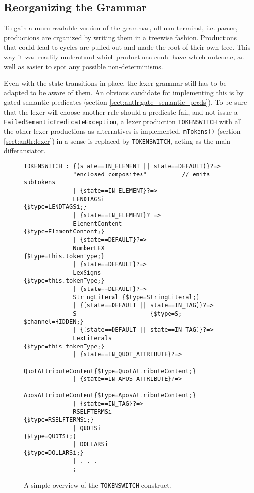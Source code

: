 \subsection{Reorganizing the Grammar}
\label{sect:rewriteGrammar:reorganizing}

To gain a more readable version of the grammar, all non-terminal, i.e. parser, productions are organized by writing them in a treewise fashion. Productions that could lead to cycles are pulled out and made the root of their own tree. This way it was readily understood which productions could have which outcome, as well as easier to spot any possible non-determinisms.

Even with the state transitions in place, the lexer grammar still has to be adapted to be aware of them. An obvious candidate for implementing this is by gated semantic predicates (section \ref{sect:antlr:gate_semantic_preds}). To be sure that the lexer will choose another rule should a predicate fail, and not issue a \verb!FailedSemanticPredicateException!, a lexer production \verb!TOKENSWITCH! with all the other lexer productions as alternatives is implemented. \verb!mTokens()! (section \ref{sect:antlr:lexer}) in a sense is replaced by \verb!TOKENSWITCH!, acting as the main differansiator. 

\begin{figure}[h!]
\begin{Verbatim}
TOKENSWITCH : {(state==IN_ELEMENT || state==DEFAULT)}?=>
              "enclosed composites"          // emits subtokens
              | {state==IN_ELEMENT}?=>
              LENDTAGSi                      {$type=LENDTAGSi;}
              | {state==IN_ELEMENT}? =>
              ElementContent            {$type=ElementContent;} 
              | {state==DEFAULT}?=>
              NumberLEX	                {$type=this.tokenType;}
              | {state==DEFAULT}?=>
              LexSigns                  {$type=this.tokenType;}
              | {state==DEFAULT}?=>
              StringLiteral {$type=StringLiteral;}
              | {(state==DEFAULT || state==IN_TAG)}?=>
              S                     {$type=S; $channel=HIDDEN;}
              | {(state==DEFAULT || state==IN_TAG)}?=>
              LexLiterals               {$type=this.tokenType;} 
              | {state==IN_QUOT_ATTRIBUTE}?=>
              QuotAttributeContent{$type=QuotAttributeContent;}
              | {state==IN_APOS_ATTRIBUTE}?=>
              AposAttributeContent{$type=AposAttributeContent;}
              | {state==IN_TAG}?=>
              RSELFTERMSi                  {$type=RSELFTERMSi;}
              | QUOTSi                          {$type=QUOTSi;}
              | DOLLARSi                      {$type=DOLLARSi;}
              | . . .
              ;

\end{Verbatim}
\caption[Overview of the \texttt{TOKENSWITCH} construct]{A simple overview of the \texttt{TOKENSWITCH} construct.}
\label{fig:tokenswitch}
\end{figure}

